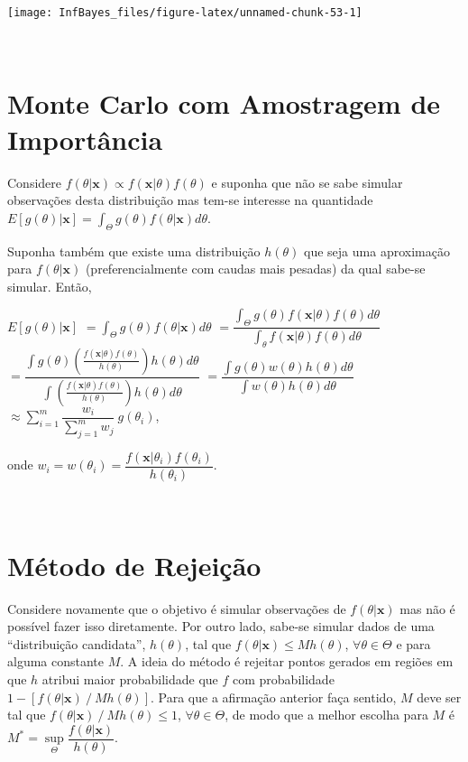 \documentclass[
]{book}
\begin{document}
\begin{center}\texttt{[image: InfBayes\_files/figure-latex/unnamed-chunk-53-1]} \end{center}

\(~\)

\hypertarget{monte-carlo-com-amostragem-de-importuxe2ncia}{%
\section{Monte Carlo com Amostragem de Importância}\label{monte-carlo-com-amostragem-de-importuxe2ncia}}

Considere \(f(\theta|\boldsymbol x)\propto f(\boldsymbol x| \theta)f(\theta)\) e suponha que não se sabe simular observações desta distribuição mas tem-se interesse na quantidade \(E\left[g(\theta)|\boldsymbol x\right]=\displaystyle\int_\Theta g(\theta)f(\theta| \boldsymbol x)d\theta\).

Suponha também que existe uma distribuição \(h(\theta)\) que seja uma aproximação para \(f(\theta|\boldsymbol x)\) (preferencialmente com caudas mais pesadas) da qual sabe-se simular. Então,

\(E\left[g(\theta)| \boldsymbol x\right]\)
\(=\displaystyle\int_\Theta g(\theta)f(\theta|\boldsymbol x)d\theta\)
\(=\dfrac{\displaystyle \int_\Theta g(\theta)f(\boldsymbol x|\theta)f(\theta)d\theta}{\displaystyle\int_\theta f(\boldsymbol x|\theta)f(\theta)d\theta}\)
\(=\dfrac{\displaystyle \int g(\theta)\left(\frac{f(\boldsymbol x|\theta)f(\theta)}{h(\theta)}\right)h(\theta)d\theta}{\displaystyle\int\left(\frac{f(\boldsymbol x|\theta)f(\theta)}{h(\theta)}\right)h(\theta)d\theta}\) \(=\dfrac{\displaystyle\int g(\theta)w(\theta)h(\theta)d\theta}{\displaystyle\int w(\theta)h(\theta)d\theta}\)
\(\approx \displaystyle\sum_{i=1}^m \dfrac{w_i}{\sum_{j=1}^mw_j}~g(\theta_i)\),

onde \(w_i=w(\theta_i)=\dfrac{f(\boldsymbol x|\theta_i)f(\theta_i)}{h(\theta_i)}\).

\(~\)

\hypertarget{muxe9todo-de-rejeiuxe7uxe3o}{%
\section{Método de Rejeição}\label{muxe9todo-de-rejeiuxe7uxe3o}}

Considere novamente que o objetivo é simular observações de \(f(\theta|\boldsymbol x)\) mas não é possível fazer isso diretamente. Por outro lado, sabe-se simular dados de uma ``distribuição candidata'', \(h(\theta)\), tal que \(f(\theta|\boldsymbol x)\leq Mh(\theta)\), \(\forall \theta \in \Theta\) e para alguma constante \(M\). A ideia do método é rejeitar pontos gerados em regiões em que \(h\) atribui maior probabilidade que \(f\) com probabilidade \(1-\left[f(\theta|\boldsymbol x)~/~Mh(\theta)\right]\). Para que a afirmação anterior faça sentido, \(M\) deve ser tal que \(f(\theta|\boldsymbol x)~/~ Mh(\theta) \leq 1\), \(\forall \theta \in \Theta\), de modo que a melhor escolha para \(M\) é \(M^*=\underset{\Theta}{\sup}\dfrac{f(\theta|\boldsymbol x)}{h(\theta)}\).
\end{document}
